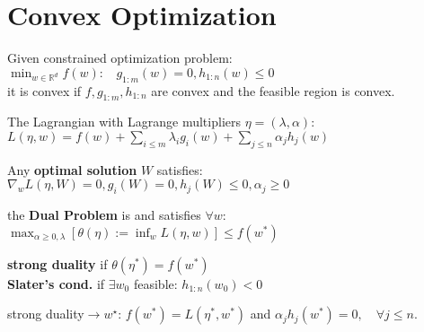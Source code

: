 \section*{Convex Optimization}

Given constrained optimization problem:
$\min_{w \in \mathbb{R}^d} f(w) :\ \ \ \  g_{1:m}(w) {=} 0,  h_{1:n}(w) {\leq} 0$ \\
it is convex if $f, g_{1:m}, h_{1:n}$ are convex and the feasible region is convex.

The Lagrangian with Lagrange multipliers $\eta = (\lambda, \alpha)$:
$L(\eta, w) = f(w) + \sum_{i \leq m} \lambda_i g_i(w) + \sum_{j \leq n} \alpha_j h_j(w)$

Any \textbf{optimal solution} $W$ satisfies:
$\nabla_w L(\eta, W) {=} 0, g_i(W) {=} 0,  h_j(W) {\leq} 0, \alpha_j {\geq} 0$

the \textbf{Dual Problem} is and satisfies $\forall w$: \\
$\max_{\alpha \geq 0,\lambda} \left[\theta(\eta) := \inf_w L(\eta, w)\right] {\leq} f(w^*)$

\textbf{strong duality} if $\theta(\eta^*) {=} f(w^*)$ \\
\textbf{Slater’s cond.} if $\exists w_0$ feasible: $h_{1:n}(w_0) {<} 0$

strong duality$\rightarrow w^\star$:
$f(w^*) {=} L(\eta^*, w^*)$ and 
$\alpha_j h_j(w^*) = 0, \quad \forall j \leq n.$





